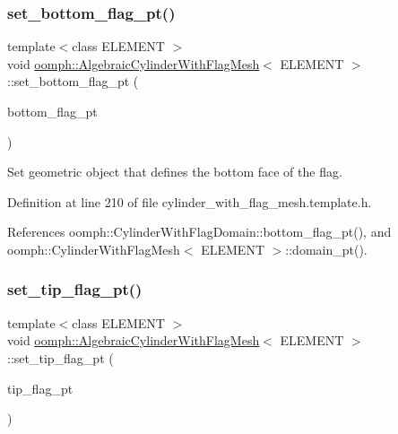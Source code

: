 \subsubsection{\texorpdfstring{set\+\_\+bottom\+\_\+flag\+\_\+pt()}{set\_bottom\_flag\_pt()}}
{\footnotesize\ttfamily template$<$class E\+L\+E\+M\+E\+NT $>$ \\
void \hyperlink{classoomph_1_1AlgebraicCylinderWithFlagMesh}{oomph\+::\+Algebraic\+Cylinder\+With\+Flag\+Mesh}$<$ E\+L\+E\+M\+E\+NT $>$\+::set\+\_\+bottom\+\_\+flag\+\_\+pt (\begin{DoxyParamCaption}\item[{\hyperlink{classoomph_1_1GeomObject}{Geom\+Object} $\ast$}]{bottom\+\_\+flag\+\_\+pt }\end{DoxyParamCaption})\hspace{0.3cm}{\ttfamily [inline]}}



Set geometric object that defines the bottom face of the flag. 



Definition at line 210 of file cylinder\+\_\+with\+\_\+flag\+\_\+mesh.\+template.\+h.



References oomph\+::\+Cylinder\+With\+Flag\+Domain\+::bottom\+\_\+flag\+\_\+pt(), and oomph\+::\+Cylinder\+With\+Flag\+Mesh$<$ E\+L\+E\+M\+E\+N\+T $>$\+::domain\+\_\+pt().

\mbox{\label{classoomph_1_1AlgebraicCylinderWithFlagMesh_a191d736d9acbeb5927fc5f472420e9f6}} 
\subsubsection{\texorpdfstring{set\+\_\+tip\+\_\+flag\+\_\+pt()}{set\_tip\_flag\_pt()}}
{\footnotesize\ttfamily template$<$class E\+L\+E\+M\+E\+NT $>$ \\
void \hyperlink{classoomph_1_1AlgebraicCylinderWithFlagMesh}{oomph\+::\+Algebraic\+Cylinder\+With\+Flag\+Mesh}$<$ E\+L\+E\+M\+E\+NT $>$\+::set\+\_\+tip\+\_\+flag\+\_\+pt (\begin{DoxyParamCaption}\item[{\hyperlink{classoomph_1_1GeomObject}{Geom\+Object} $\ast$}]{tip\+\_\+flag\+\_\+pt }\end{DoxyParamCaption})\hspace{0.3cm}{\ttfamily [inline]}}



